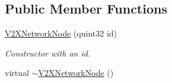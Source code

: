 \subsection*{Public Member Functions}
\begin{DoxyCompactItemize}
\item 
\hyperlink{classV2XNetworkNode_a629990c53b6e3f0086d87f71ad57f0a3}{V2\+X\+Network\+Node} (quint32 id)
\begin{DoxyCompactList}\small\item\em Constructor with an id. \end{DoxyCompactList}\item 
virtual \hyperlink{classV2XNetworkNode_a3c022f71b67ecff71ac4fa7b9b45deeb}{$\sim$\+V2\+X\+Network\+Node} ()\hypertarget{classV2XNetworkNode_a3c022f71b67ecff71ac4fa7b9b45deeb}{}\label{classV2XNetworkNode_a3c022f71b67ecff71ac4fa7b9b45deeb}


\end{DoxyCompactItemize}
